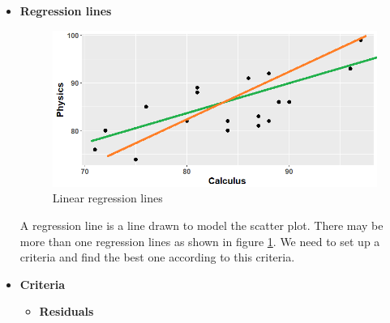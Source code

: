 \documentclass[a4paper, 12pt,twoside]{book}
\begin{document}
\begin{itemize}
\item \textbf{Regression lines}
\begin{figure}[H]
\centering
\includegraphics[scale=0.5]{LinearRegressionLines.png}
\caption{Linear regression lines}
\label{LinearRegressionLines}
\end{figure}
A regression line is a line drawn to model the scatter plot. There may be more than one regression lines as shown in figure \ref{LinearRegressionLines}. We need to set up a criteria and find the best one according to this criteria.\vspace{0.3cm}

\item \textbf{Criteria}
        
  \begin{itemize}
   \item \textbf{Residuals}
       \vspace{0.6cm}
   

\end{itemize}
\end{itemize}
\end{document}
